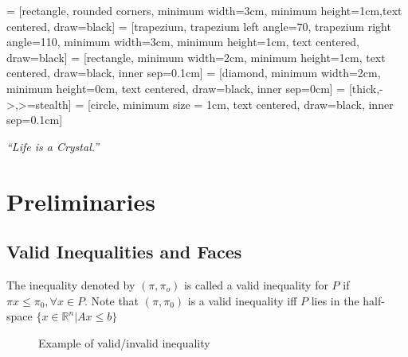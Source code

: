 
\usepackage{makecell}
\usepackage{float}
\newcommand{\floor}[1]{\left\lfloor #1 \right\rfloor}
\newcommand{\ceil}[1]{\left\lceil #1 \right\rceil}

\usetikzlibrary{shapes.geometric, arrows}
     = [rectangle, rounded corners, minimum width=3cm, minimum height=1cm,text centered, draw=black]
     = [trapezium, trapezium left angle=70, trapezium right angle=110, minimum width=3cm, minimum height=1cm, text centered, draw=black]
     = [rectangle, minimum width=2cm, minimum height=1cm, text centered, draw=black, inner sep=0.1cm]
     = [diamond, minimum width=2cm, minimum height=0cm, text centered, draw=black, inner sep=0cm]
     = [thick,->,>=stealth]
     = [circle, minimum size = 1cm, text centered, draw=black, inner sep=0.1cm]

\renewcommand{\docTitle}{Lecture Note - (Lecture)}
\renewcommand{\docAuthor}{Lan Peng, Ph.D.}
\renewcommand{\docAffil}{School of Management, Shanghai University, Shanghai, China}

    \titleSec

    \begin{center}
        \textit{``Life is a Crystal.''}
    \end{center}
    \section{Preliminaries}
        \subsection{Valid Inequalities and Faces}
            The inequality denoted by $(\pi, \pi_o)$ is called a valid inequality for $P$ if $\pi x \le \pi_0, \forall x \in P$. Note that $(\pi, \pi_0)$ is a valid inequality iff $P$ lies in the half-space $\{x\in \mathbb{R}^n|Ax\le b\}$

            \begin{figure}[H]
            \centering
            \caption{Example of valid/invalid inequality}
            \end{figure}

